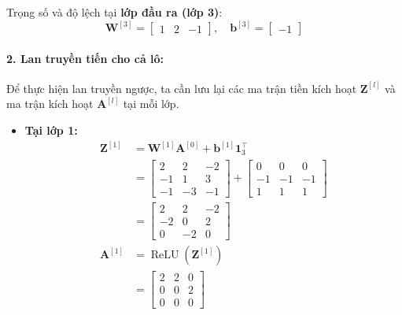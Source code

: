 Trọng số và độ lệch tại \textbf{lớp đầu ra (lớp 3)}:
\begin{equation}
\mathbf{W}^{[3]} =
\begin{bmatrix}
    1 & 2 & -1
\end{bmatrix},
\quad
\mathbf{b}^{[3]} =
\begin{bmatrix}
-1
\end{bmatrix}
\end{equation}

\paragraph{2. Lan truyền tiến cho cả lô:}
Để thực hiện lan truyền ngược, ta cần lưu lại các ma trận tiền kích hoạt $\mathbf{Z}^{[l]}$ và ma trận kích hoạt $\mathbf{A}^{[l]}$ tại mỗi lớp. 
\begin{itemize}
    \item \textbf{Tại lớp 1:}
    \begin{align*}
    \mathbf{Z}^{[1]} &= \mathbf{W}^{[1]}\mathbf{A}^{[0]} + \mathbf{b}^{[1]}\mathbf{1}_3^{\top} \\
    &= \begin{bmatrix} 2 & 2 & -2 \\ -1 & 1 & 3 \\ -1 & -3 & -1 \end{bmatrix} + \begin{bmatrix} 0 & 0 & 0 \\ -1 & -1 & -1 \\ 1 & 1 & 1 \end{bmatrix} \\
    &= \begin{bmatrix} 2 & 2 & -2 \\ -2 & 0 & 2 \\ 0 & -2 & 0 \end{bmatrix} \\
    \mathbf{A}^{[1]} &= \operatorname{ReLU}\!\left(\mathbf{Z}^{[1]}\right) \\
    &= \begin{bmatrix} 2 & 2 & 0 \\ 0 & 0 & 2 \\ 0 & 0 & 0 \end{bmatrix}
    \end{align*}


\end{itemize}
